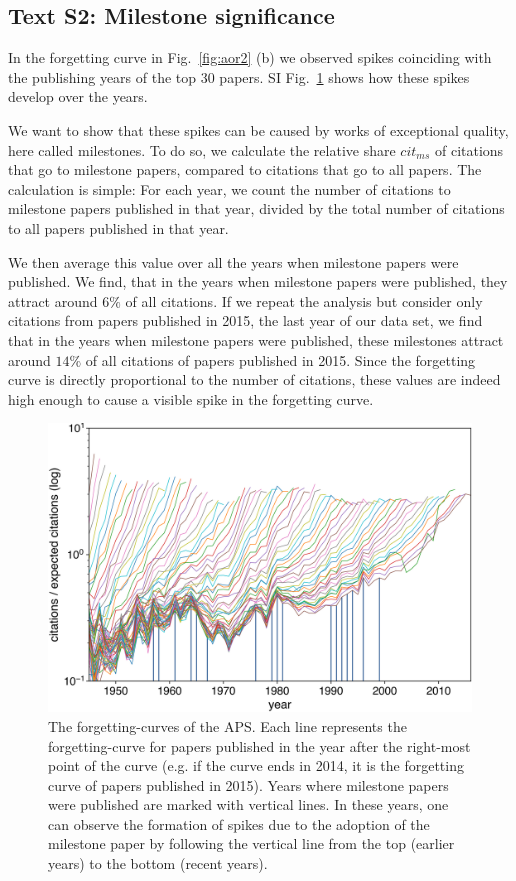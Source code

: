 \documentclass[fleqn,10pt]{wlscirep}
\begin{document}
\subsection*{Text S2: Milestone significance}
\label{SI2}

In the forgetting curve in Fig.~\ref{fig:aor2} (b) we observed spikes coinciding with the publishing years of the top 30 papers. SI Fig.~\ref{fig:vitosplot} shows how these spikes develop over the years.

We want to show that these spikes can be caused by works of exceptional quality, here called milestones. To do so, we calculate the relative share $cit_{ms}$ of citations that go to milestone papers, compared to citations that go to all papers. The calculation is simple: For each year, we count the number of citations to milestone papers published in that year, divided by the total number of citations to all papers published in that year.

We then average this value over all the years when milestone papers were published. We find, that in the years when milestone papers were published, they attract around $6\%$ of all citations. If we repeat the analysis but consider only citations from papers published in 2015, the last year of our data set, we find that in the years when milestone papers were published, these milestones attract around $14\%$ of all citations of papers published in 2015. Since the forgetting curve is directly proportional to the number of citations, these values are indeed high enough to cause a visible spike in the forgetting curve. 




\begin{figure}[h!]
	\centering
	 \includegraphics[width=0.7\columnwidth]{4.png}
	\caption{The forgetting-curves of the APS. Each line represents the forgetting-curve for papers published in the year after the right-most point of the curve (e.g. if the curve ends in 2014, it is the forgetting curve of papers published in 2015). Years where milestone papers were published are marked with vertical lines. In these years, one can observe the formation of spikes due to the adoption of the milestone paper by following the vertical line from the top (earlier years) to the bottom (recent years).
	}
	\label{fig:vitosplot}
\end{figure}
\end{document}

